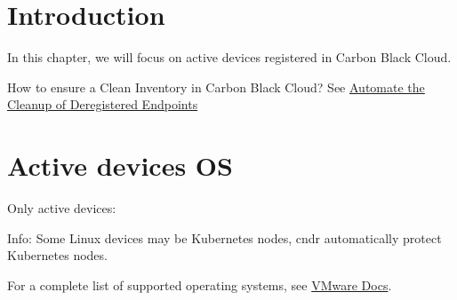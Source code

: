 \section{Introduction}

In this chapter, we will focus on \gls{active} devices registered in Carbon Black Cloud.\\

\begin{tipblock}
How to ensure a Clean Inventory in Carbon Black Cloud? See 
\href{https://carbonblack.vmware.com/blog/automate-cleanup-deregistered-endpoints}{Automate the Cleanup of Deregistered Endpoints}
\end{tipblock}

\section{Active devices OS}

Only \gls{active} devices:



 \begin{noteblock}
Info: Some Linux devices may be Kubernetes nodes, \gls{cndr} automatically protect Kubernetes nodes.
\end{noteblock} 

For a complete list of supported operating systems, see \href{https://docs.vmware.com/en/VMware-Carbon-Black-Cloud/services/cbc-endpoint-standard-oer/GUID-45BFDC75-748B-4E05-8B38-190B59204D0B.html}{VMware Docs}.\\




%



